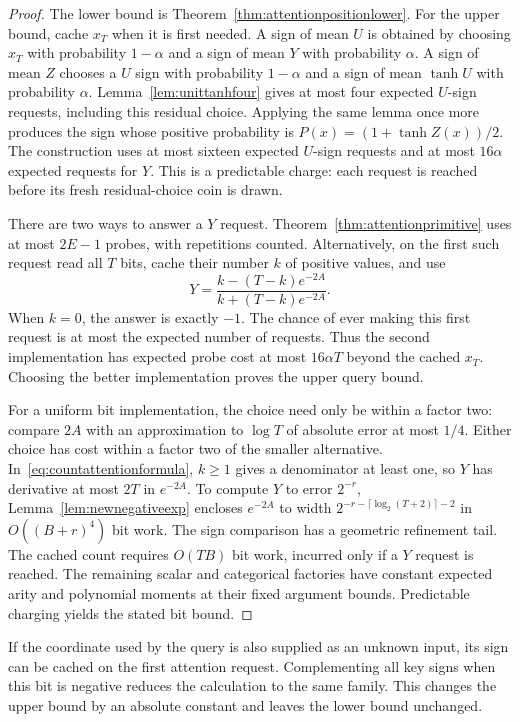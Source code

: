 \begin{proof}
The lower bound is Theorem~\ref{thm:attentionpositionlower}.
For the upper bound, cache $x_T$ when it is first needed.  A sign of mean
$U$ is obtained by choosing $x_T$ with probability $1-\alpha$ and a sign of
mean $Y$ with probability $\alpha$.  A sign of mean $Z$ chooses a $U$ sign
with probability $1-\alpha$ and a sign of mean $\tanh U$ with probability
$\alpha$.  Lemma~\ref{lem:unittanhfour} gives at most four expected
$U$-sign requests, including this residual choice.  Applying the same
lemma once more produces the sign whose positive probability is
$P(x)=(1+\tanh Z(x))/2$.  The construction uses at most sixteen expected
$U$-sign requests and at most $16\alpha$ expected requests for $Y$.
This is a predictable charge: each request is reached before its fresh
residual-choice coin is drawn.

There are two ways to answer a $Y$ request.  Theorem~\ref{thm:attentionprimitive}
uses at most $2E-1$ probes, with repetitions counted.  Alternatively, on
the first such request read all $T$ bits, cache their number $k$ of positive
values, and use
\begin{equation}\label{eq:countattentionformula}
 Y=\frac{k-(T-k)e^{-2A}}{k+(T-k)e^{-2A}}.
\end{equation}
When $k=0$, the answer is exactly $-1$.  The chance of ever making this
first request is at most the expected number of requests.  Thus the
second implementation has expected probe cost at most
$16\alpha T$ beyond the cached $x_T$.  Choosing the better
implementation proves the upper query bound.

For a uniform bit implementation, the choice need only be within a
factor two: compare $2A$ with an approximation to $\log T$ of absolute
error at most $1/4$.  Either choice has cost within a factor two of the
smaller alternative.  In~\eqref{eq:countattentionformula}, $k\ge1$ gives a
denominator at least one, so $Y$ has derivative at most $2T$ in
$e^{-2A}$.  To compute $Y$ to error $2^{-r}$,
Lemma~\ref{lem:newnegativeexp} encloses $e^{-2A}$ to width
$2^{-r-\lceil\log_2(T+2)\rceil-2}$ in $O((B+r)^4)$ bit work.  The sign
comparison has a geometric refinement
tail.  The cached count requires $O(TB)$ bit work, incurred only if a
$Y$ request is reached.  The remaining scalar and categorical factories
have constant expected arity and polynomial moments at their fixed
argument bounds.  Predictable charging yields the stated bit bound.
\end{proof}

If the coordinate used by the query is also supplied as an unknown input,
its sign can be cached on the first attention request.  Complementing all
key signs when this bit is negative reduces the calculation to the same
family.  This changes the upper bound by an absolute constant and leaves
the lower bound unchanged.

